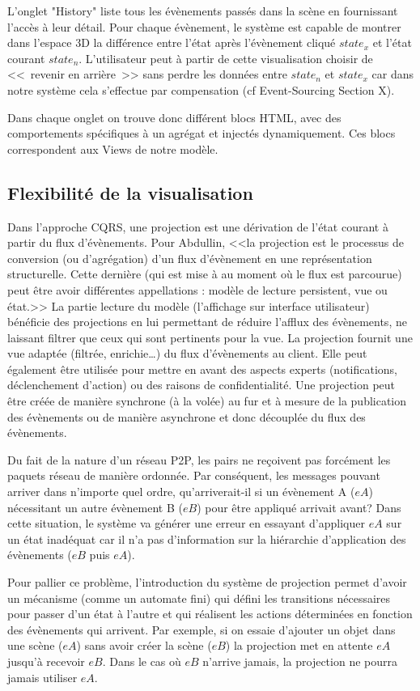 L'onglet "History" liste tous les évènements passés dans la scène en fournissant 
l'accès à leur détail. Pour chaque évènement, le système est capable de montrer 
dans l'espace 3D la différence entre l'état  après l'évènement cliqué $state_x$ et 
l'état courant $state_n$. L'utilisateur peut à partir de cette visualisation choisir de 
<<~revenir en arrière~>> sans perdre les données entre $state_n$ et $state_x$ 
car dans notre système cela s'effectue par compensation (cf Event-Sourcing 
Section X).

Dans chaque onglet on trouve donc différent blocs \gls{HTML}, avec des 
comportements spécifiques à un agrégat et injectés dynamiquement. Ces blocs 
correspondent aux Views de notre modèle.

\subsection{Flexibilité de la visualisation}
Dans l'approche \gls{CQRS}, une projection est une dérivation de l'état courant à 
partir du flux d'évènements. Pour Abdullin, <<la projection est le processus de 
conversion (ou d'agrégation) d'un flux d'évènement en une représentation 
structurelle. Cette dernière (qui est mise à au moment où le flux est parcourue) 
peut être avoir différentes appellations : modèle de lecture persistent, vue ou 
état.>>
La partie lecture du modèle (l'affichage sur interface utilisateur) bénéficie des 
projections en lui permettant de réduire l'afflux des évènements, ne laissant filtrer 
que ceux qui sont pertinents pour la vue. La projection fournit une vue adaptée 
(filtrée, enrichie\ldots) du flux d'évènements au client. Elle peut également être 
utilisée pour mettre en avant des aspects experts (notifications, déclenchement 
d'action) ou des raisons de confidentialité.
Une projection peut être créée de manière synchrone (à la volée) au fur et à 
mesure de la publication des évènements ou de manière asynchrone et donc 
découplée du flux des évènements. 


Du fait de la nature d'un réseau \gls{P2P}, les pairs ne reçoivent pas forcément les 
paquets réseau de manière ordonnée.
Par conséquent, les messages pouvant arriver dans n'importe quel ordre, 
qu'arriverait-il si un évènement A ($eA$) nécessitant un autre évènement B ($eB$) 
pour être appliqué arrivait avant? Dans cette situation, le système va générer une 
erreur en essayant d'appliquer $eA$ sur un état inadéquat car il n'a pas 
d'information sur la hiérarchie d'application des évènements ($eB$ puis $eA$).

Pour pallier ce problème, l'introduction du système de projection permet d'avoir un 
mécanisme (comme un automate fini) qui défini les transitions nécessaires pour 
passer d'un état à l'autre et qui réalisent les actions déterminées en fonction des 
évènements qui arrivent. Par exemple, si on essaie d'ajouter un objet dans une 
scène  ($eA$) sans avoir créer la scène ($eB$) la projection met en attente $eA$ 
jusqu'à recevoir $eB$. Dans le cas où $eB$ n'arrive jamais, la projection ne pourra 
jamais utiliser $eA$.
